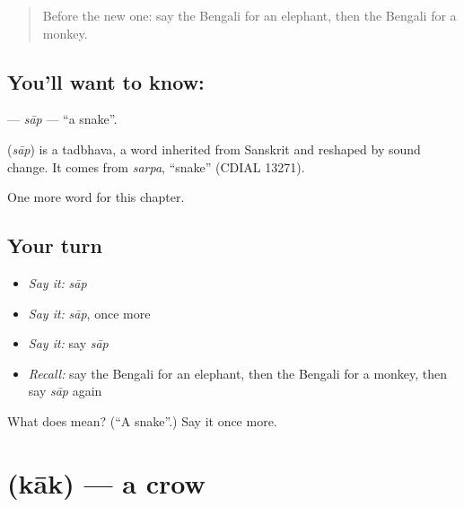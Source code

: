 \label{lesson:BN-C70-sap}



\begin{quote}
Before the new one: say the Bengali for an elephant, then the Bengali for a monkey.
\end{quote}

\subsection*{You'll want to know: }
\textbf{} — \emph{sāp} — \textquotedblleft{}a snake\textquotedblright{}.

\begin{cousinweb}
\textbf{} (\emph{sāp}) is a tadbhava, a word inherited from Sanskrit and reshaped by sound change. It comes from \emph{sarpa}, \textquotedblleft{}snake\textquotedblright{} (CDIAL 13271).
\end{cousinweb}

\begin{grammarlens}[title={What you've built}]
One more word for this chapter.
\end{grammarlens}

\subsection*{Your turn}
\begin{itemize}
\raggedright
  \item \emph{Say it:} \emph{sāp}
  \item \emph{Say it:} \emph{sāp}, once more
  \item \emph{Say it:} say \emph{sāp}
  \item \emph{Recall:} say the Bengali for an elephant, then the Bengali for a monkey, then say \emph{sāp} again
\end{itemize}

\begin{tcolorbox}[breakable,colback=teal!4,colframe=teal!35!black,title={Before you move on}]
What does  mean? (\textquotedblleft{}A snake\textquotedblright{}.) Say it once more.
\end{tcolorbox}
\section[\texorpdfstring{\bn{কাক} (kāk)}{কাক (kāk)}]{ (kāk) — a crow}

\label{lesson:BN-C70-kak}



